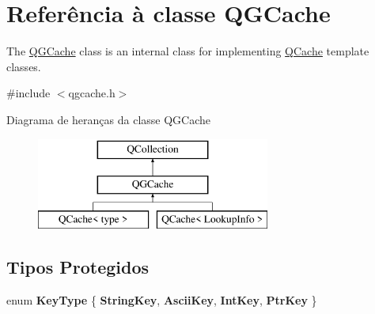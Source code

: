 \hypertarget{class_q_g_cache}{\section{Referência à classe Q\-G\-Cache}
\label{class_q_g_cache}
}


The \hyperlink{class_q_g_cache}{Q\-G\-Cache} class is an internal class for implementing \hyperlink{class_q_cache}{Q\-Cache} template classes.  




{\ttfamily \#include $<$qgcache.\-h$>$}

Diagrama de heranças da classe Q\-G\-Cache\begin{figure}[H]
\begin{center}
\leavevmode
\includegraphics[height=3.000000cm]{class_q_g_cache}
\end{center}
\end{figure}
\subsection*{Tipos Protegidos}
\begin{DoxyCompactItemize}
\item 
enum {\bfseries Key\-Type} \{ {\bfseries String\-Key}, 
{\bfseries Ascii\-Key}, 
{\bfseries Int\-Key}, 
{\bfseries Ptr\-Key}
 \}
\end{DoxyCompactItemize}
